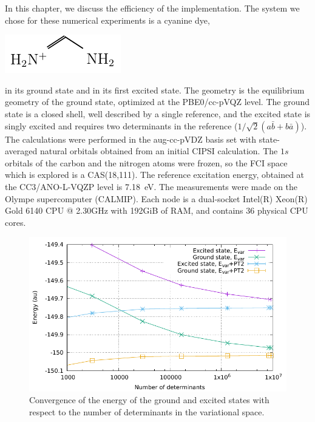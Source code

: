 \documentclass[./thesis.tex]{subfiles}
\begin{document}
In this chapter, we discuss the efficiency of the implementation. The system
we chose for these numerical experiments is a cyanine dye, \\
\begin{center}
\includegraphics[]{figures/perf/Cyanine} \\
\end{center}
in its ground state and in its first excited state.
The geometry is the equilibrium geometry of the ground state, optimized at the
PBE0/cc-pVQZ level. The ground state is a closed shell, well described by a
single reference, and the excited state is singly excited and requires two
determinants in the reference ($1/\sqrt{2} (a\bar{b} + b\bar{a})$).  The
calculations were performed in the aug-cc-pVDZ basis set with state-averaged
natural orbitals obtained from an initial CIPSI calculation.
The $1s$ orbitals of the carbon and the nitrogen atoms were frozen, so
the FCI space which is explored is a CAS(18,111). The reference excitation
energy, obtained at the CC3/ANO-L-VQZP level is 7.18~eV.\cite{Send_2011}
The measurements were made on the Olympe supercomputer (CALMIP). Each node is 
a dual-socket Intel(R) Xeon(R) Gold 6140 CPU @ 2.30GHz with 192GiB of RAM, and
contains 36 physical CPU cores.

\begin{figure}[h]
	\begin{center}
		\includegraphics[width=0.8\columnwidth]{figures/perf/cn3_energy}
		\caption{Convergence of the energy of the ground and excited states with respect to the number of determinants in the variational space.}
		\label{fig:energy_pt2}
	\end{center}
\end{figure}
\end{document}
